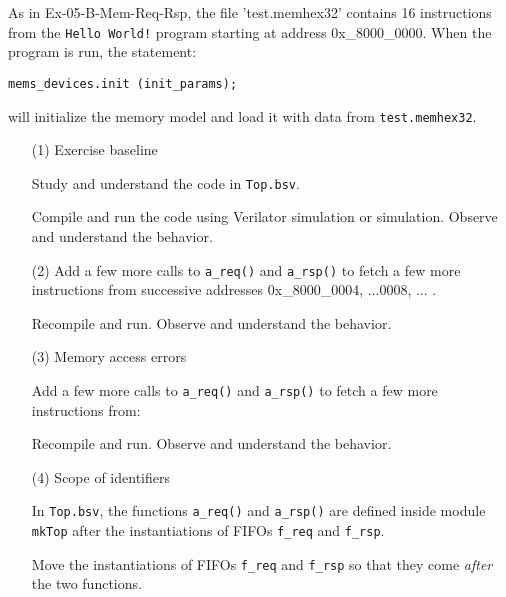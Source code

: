 As in Ex-05-B-Mem-Req-Rsp, the file 'test.memhex32' contains 16
instructions from the \verb|Hello World!| program starting at address
0x\_8000\_0000.  When the program is run, the statement:

{\footnotesize
\begin{Verbatim}[frame=single]
    mems_devices.init (init_params);
\end{Verbatim}
}

will initialize the memory model and load it with data from
\verb|test.memhex32|.

\begin{itemize}

\item[(1)] Exercise baseline

    Study and understand the code in \verb|Top.bsv|.

    Compile and run the code using Verilator simulation or {\BLUESIM}
    simulation.  Observe and understand the behavior.

\item[(2)] Add a few more calls to \verb|a_req()| and \verb|a_rsp()|
    to fetch a few more instructions from successive addresses
    0x\_8000\_0004, ...0008, ... {\etc}.

    Recompile and run.  Observe and understand the behavior.

\item[(3)] Memory access errors

    Add a few more calls to \verb|a_req()| and \verb|a_rsp()| to fetch
    a few more instructions from:


    Recompile and run. Observe and understand the behavior.

\item[(4)] Scope of identifiers

    In \verb|Top.bsv|, the functions \verb|a_req()| and \verb|a_rsp()|
    are defined inside module \verb|mkTop| after the instantiations of
    FIFOs \verb|f_req| and \verb|f_rsp|.

    Move the instantiations of FIFOs \verb|f_req| and \verb|f_rsp| so
    that they come \emph{after} the two functions.


\end{itemize}
